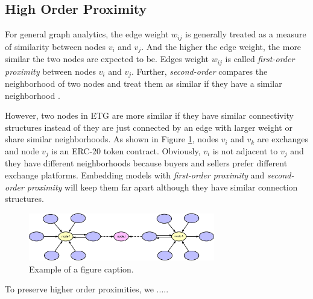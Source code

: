 \subsection{High Order Proximity}
For general graph analytics, the edge weight $w_{ij}$ is generally treated as a measure of similarity between nodes $v_i$ and $v_j$. And the higher the edge weight, the more similar the two nodes are expected to be. Edges weight $w_{ij}$ is called \emph{first-order proximity} between nodes $v_i$ and $v_j$. Further, \emph{second-order} compares the neighborhood of two nodes and treat them as similar if they have a similar neighborhood \cite{goyal2018graph}.

However, two nodes in ETG are more similar if they have similar connectivity structures instead of they are just connected by an edge with larger weight or share similar neighborhoods. As shown in Figure \ref{fig:high_order}, nodes $v_i$ and $v_k$ are exchanges and node $v_j$ is an ERC-20 token contract. Obviously, $v_i$ is not adjacent to $v_j$ and they have different neighborhoods because buyers and sellers prefer different exchange platforms. Embedding models with \emph{first-order proximity} and \emph{second-order proximity} will keep them far apart although they have similar connection structures. 

\begin{figure}[htbp]
	\centering
	\includegraphics[width=3.2in]{fig/high_order_proximity.eps}
	\caption{Example of a figure caption.}
	\label{fig:high_order}
\end{figure}

To preserve higher order proximities, we .....